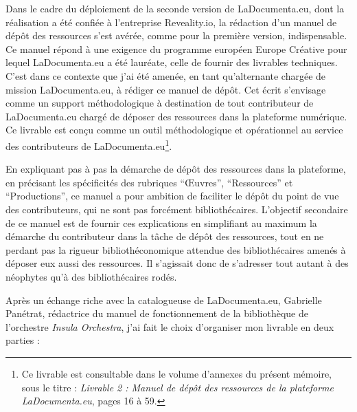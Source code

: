 Dans le cadre du déploiement de la seconde version de LaDocumenta.eu, dont la réalisation a été confiée à l'entreprise Reveality.io, la rédaction d'un manuel de dépôt des ressources s'est avérée, comme pour la première version, indispensable. Ce manuel répond à une exigence du programme européen Europe Créative pour lequel LaDocumenta.eu a été lauréate, celle de fournir des livrables techniques. C'est dans ce contexte que j'ai été amenée, en tant qu'alternante chargée de mission LaDocumenta.eu, à rédiger ce manuel de dépôt. Cet écrit s'envisage comme un support méthodologique à destination de tout contributeur de LaDocumenta.eu chargé de déposer des ressources dans la plateforme numérique. Ce livrable est conçu comme un outil méthodologique et opérationnel au service des contributeurs de LaDocumenta.eu\footnote{Ce livrable est consultable dans le volume d'annexes du présent mémoire, sous le titre : \textit{Livrable 2 : Manuel de dépôt des ressources de la plateforme LaDocumenta.eu}, pages 16 à 59.}. 

En expliquant pas à pas la démarche de dépôt des ressources dans la plateforme, en précisant les spécificités des rubriques \enquote{Œuvres}, \enquote{Ressources} et \enquote{Productions}, ce manuel a pour ambition de faciliter le dépôt du point de vue des contributeurs, qui ne sont pas forcément bibliothécaires. L'objectif secondaire de ce manuel est de fournir ces explications en simplifiant au maximum la démarche du contributeur dans la tâche de dépôt des ressources, tout en ne perdant pas la rigueur bibliothéconomique attendue des bibliothécaires amenés à déposer eux aussi des ressources. Il s'agissait donc de s'adresser tout autant à des néophytes qu'à des bibliothécaires rodés. 



Après un échange riche avec la catalogueuse de LaDocumenta.eu, Gabrielle Panétrat, rédactrice du manuel de fonctionnement de la bibliothèque de l'orchestre \textit{Insula Orchestra}, j'ai fait le choix d'organiser mon livrable en deux parties : 


